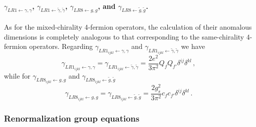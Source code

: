 \paragraph{$\gamma_{LR1 \leftarrow \gamma,\gamma}$, $\gamma_{LR1 \leftarrow \tilde \gamma,\tilde \gamma}$, $\gamma_{LR8\leftarrow g,g}$, and $\gamma_{LR8\leftarrow \tilde g, \tilde g}$.}
As for the mixed-chirality 4-fermion operators, the calculation of their anomalous dimensions is completely analogous to that corresponding to the same-chirality 4-fermion operators.
Regarding $\gamma_{LR1_{ijkl} \leftarrow \gamma,\gamma}$ and $\gamma_{LR1_{ijkl} \leftarrow \tilde \gamma,\tilde \gamma}$ we have
\begin{equation}
    \gamma_{LR1_{ijkl} \leftarrow \gamma,\gamma} = \gamma_{LR1_{ijkl} \leftarrow \tilde \gamma,\tilde \gamma} = \frac{2e^2}{3\pi^2}Q_f Q_{f'} \delta^{ij} \delta^{kl}\,,
\end{equation}
while for $\gamma_{LR8_{ijkl}\leftarrow g,g}$ and $\gamma_{LR8_{ijkl} \leftarrow \tilde g, \tilde g}$
\begin{equation}
    \gamma_{LR8_{ijkl}\leftarrow g,g} = \gamma_{LR8_{ijkl} \leftarrow \tilde g, \tilde g} = \frac{2g_s^2}{3\pi^2}c_f c_{f'} \delta^{ij} \delta^{kl}\,.
\end{equation}

\subsubsection{Renormalization group equations}

